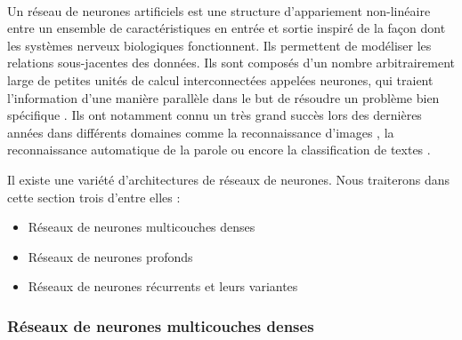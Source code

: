 		\paragraph{}
		Un réseau de neurones artificiels est une structure d'appariement non-linéaire entre un ensemble de caractéristiques en entrée et sortie inspiré de la façon dont les systèmes nerveux biologiques fonctionnent. Ils permettent de modéliser les relations sous-jacentes des données. Ils sont composés d'un nombre arbitrairement large de petites unités de calcul interconnectées appelées neurones, qui traient l'information d'une manière parallèle dans le but de résoudre un problème bien spécifique \cite{neural_nets}. Ils ont notamment connu un très grand succès lors des dernières années dans différents domaines comme la reconnaissance d'images \cite{inception}, la reconnaissance automatique de la parole \cite{speech_reco_dnn,speech_reco_Yu2015} ou encore la classification de textes \cite{seq2seq_multitask_classification,dnn_text_classification}.
		\par 
		Il existe une variété d'architectures de réseaux de neurones. Nous traiterons dans cette section trois d'entre elles : 
			\begin{itemize}
				\item Réseaux de neurones multicouches denses
				\item Réseaux de neurones profonds
				\item Réseaux de neurones récurrents et leurs variantes
			\end{itemize}
		\subsubsection{Réseaux de neurones multicouches denses}
	
